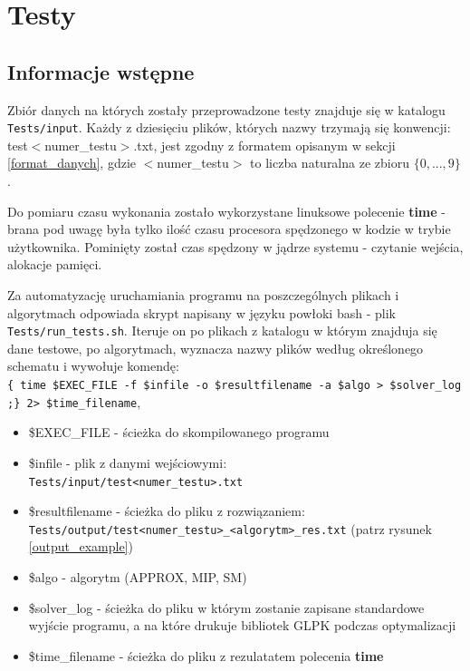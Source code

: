 \chapter{Testy}
\thispagestyle{chapterBeginStyle}


\section{Informacje wstępne}
Zbiór danych na których zostały przeprowadzone testy znajduje się w katalogu \verb|Tests/input|. Każdy z dziesięciu plików, których nazwy trzymają się konwencji: test$<$numer\_testu$>$.txt, jest zgodny z formatem opisanym w sekcji \ref{format_danych}, gdzie $<$numer\_testu$>$ to liczba naturalna ze zbioru $\{0, ..., 9\}$.

Do pomiaru czasu wykonania zostało wykorzystane linuksowe polecenie \textbf{time} - brana pod uwagę była tylko ilość czasu procesora spędzonego w kodzie w trybie użytkownika. Pominięty został czas spędzony w jądrze systemu - czytanie wejścia, alokacje pamięci.

Za automatyzację uruchamiania programu na poszczególnych plikach i algorytmach odpowiada skrypt napisany w języku powłoki bash - plik \verb|Tests/run_tests.sh|. Iteruje on po plikach z katalogu w którym znajduja się dane testowe, po algorytmach, wyznacza nazwy plików według określonego schematu i wywołuje komendę: \\
\verb|{ time $EXEC_FILE -f $infile -o $resultfilename -a $algo > $solver_log ;} 2> $time_filename|, 

\begin{itemize}
	\item \$EXEC\_FILE - ścieżka do skompilowanego programu
	\item \$infile - plik z danymi wejściowymi: \\
	\verb|Tests/input/test<numer_testu>.txt|
	\item \$resultfilename - ścieżka do pliku z rozwiązaniem: \\ \verb|Tests/output/test<numer_testu>_<algorytm>_res.txt| (patrz rysunek \ref{output_example})
	\item \$algo - algorytm (APPROX, MIP, SM)
	\item \$solver\_log - ścieżka do pliku w którym zostanie zapisane standardowe wyjście programu, a na które drukuje bibliotek GLPK podczas optymalizacji
	\item \$time\_filename - ścieżka do pliku z rezulatatem polecenia \textbf{time}
\end{itemize}

